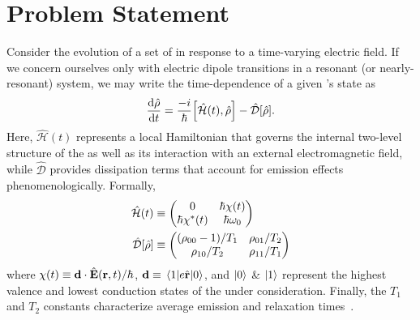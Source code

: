 \section{\label{section:problem statement}Problem Statement}
Consider the evolution of a set of \qds{} in response to a time-varying electric field.
If we concern ourselves only with electric dipole transitions in a resonant (or nearly-resonant) system, we may write the time-dependence of a given \qd's state as
\begin{equation}
  \dv{\hat{\rho}}{t} = \frac{-i}{\hbar}\commutator{\hat{\mathcal{H}}(t)}{\hat{\rho}} - \hat{\mathcal{D}}\qty[\hat{\rho}].
  \label{eq:liouville}
\end{equation}
Here, $\hat{\mathcal{H}}(t)$ represents a local Hamiltonian that governs the internal two-level structure of the \qd{} as well as its interaction with an external electromagnetic field, while $\hat{\mathcal{D}}$ provides dissipation terms that account for emission effects phenomenologically.
Formally,
\begin{subequations}
  \begin{align}
    \hat{\mathcal{H}}(t) &\equiv \mqty(0 & \hbar \chi(t) \\ \hbar \chi^*(t) & \hbar \omega_0) \label{eq:hamiltonian}\\
    \hat{\mathcal{D}}\qty[\hat{\rho}] &\equiv \mqty( \qty(\rho_{00} - 1)/{T_1} & \rho_{01}/{T_2} \\ \rho_{10}/{T_2} & \rho_{11}/T_1 ) \label{eq:dissipator}
  \end{align}
\end{subequations}
where $\chi(t) \equiv \vb{d} \cdot \hat{\vb{E}}(\vb{r}, t)/\hbar$, $\vb{d} \equiv \matrixel{1}{e \hat{\vb{r}}}{0}$, and $\ket{0}$ \& $\ket{1}$ represent the highest valence and lowest conduction states of the \qd{} under consideration.
Finally, the $T_1$ and $T_2$ constants characterize average emission and relaxation times~\cite{}.

